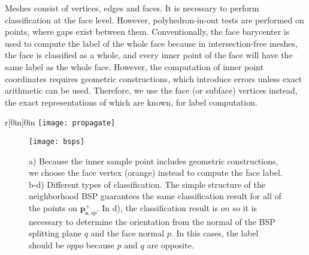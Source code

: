 
Meshes consist of vertices, edges and faces. It is necessary to perform classification at the face level. However, polyhedron-in-out tests are performed on points, where gaps exist between them. Conventionally, the face barycenter is used to compute the label of the whole face because in intersection-free meshes, the face is classified as a whole, and every inner point of the face will have the same label as the whole face. However, the computation of inner point coordinates requires geometric constructions, which introduce errors unless exact arithmetic can be used. Therefore, we use the face (or subface) vertices instead, the exact representations of which are known, for label computation.

\begin{wrapfigure}{r}[0in]{0in}
\texttt{[image: propagate]}
\end{wrapfigure}




\begin{figure}[t]
\centering
\texttt{[image: bsps]}
\caption{a) Because the inner sample point includes geometric constructions, we choose the face vertex (orange) instead to compute the face label. b-d) Different types of classification. The simple structure of the neighborhood BSP guarantees the same classification result for all of the points on $\bm{p}_{\bm{s}, sp}^+$. In d), the classification result is $on$ so it is necessary to determine the orientation from the normal of the BSP splitting plane $q$ and the face normal $p$. In this cases, the label should be $oppo$ because $p$ and $q$ are opposite.}
\label{fig:bsps}
\end{figure}


